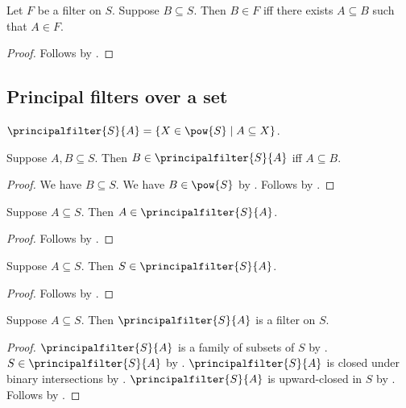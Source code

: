 \begin{proposition}\label{filter_in_iff_exists_subset}
    Let $F$ be a filter on $S$.
    Suppose $B\subseteq S$.
    Then $B\in F$ iff there exists $A\subseteq B$ such that $A\in F$.
\end{proposition}
\begin{proof}
    Follows by .
\end{proof}


\subsection{Principal filters over a set}

\begin{definition}\label{principalfilter}
    $\principalfilter{S}{A} = \{X\in\pow{S}\mid A\subseteq X\}$.
\end{definition}

\begin{proposition}\label{principalfilter_iff}
    Suppose $A, B\subseteq S$.
    Then $B\in\principalfilter{S}{A}$ iff $A\subseteq B$.
\end{proposition}
\begin{proof}
    We have $B\subseteq S$.
    We have $B\in\pow{S}$ by .
    Follows by .
\end{proof}

\begin{proposition}\label{principalfilter_bottom}
    Suppose $A\subseteq S$.
    Then $A\in\principalfilter{S}{A}$.
\end{proposition}
\begin{proof}
    Follows by .
\end{proof}

\begin{proposition}\label{principalfilter_top}
    Suppose $A\subseteq S$.
    Then $S\in\principalfilter{S}{A}$.
\end{proposition}
\begin{proof}
    Follows by .
\end{proof}

\begin{proposition}\label{principalfilter_is_filter}
    Suppose $A\subseteq S$.
    Then $\principalfilter{S}{A}$ is a filter on $S$.
\end{proposition}
\begin{proof}
    $\principalfilter{S}{A}$ is a family of subsets of $S$
        by .
    $S\in \principalfilter{S}{A}$ by .
    $\principalfilter{S}{A}$ is closed under binary intersections
        by .
    $\principalfilter{S}{A}$ is upward-closed in $S$
        by .
    Follows by .
\end{proof}

